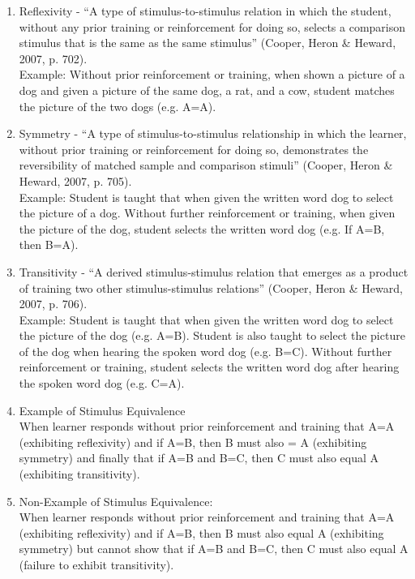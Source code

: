 \begin{enumerate}
\item Reflexivity - ``A type of stimulus-to-stimulus relation in which the student, without any prior training or reinforcement for doing so, selects a comparison stimulus that is the same as the same stimulus'' (Cooper, Heron \& Heward, 2007, p. 702).\\
 Example: Without prior reinforcement or training, when shown a picture of a dog and given a picture of the same dog, a rat, and a cow, student matches the picture of the two dogs (e.g. A=A).
\item Symmetry - ``A type of stimulus-to-stimulus relationship in which the learner, without prior training or reinforcement for doing so, demonstrates the reversibility of matched sample and comparison stimuli'' (Cooper, Heron \& Heward, 2007, p. 705).\\
 Example: Student is taught that when given the written word dog to select the picture of a dog. Without further reinforcement or training, when given the picture of the dog, student selects the written word dog (e.g. If A=B, then B=A). 
\item Transitivity - ``A derived stimulus-stimulus relation that emerges as a product of training two other stimulus-stimulus relations'' (Cooper, Heron \& Heward, 2007, p. 706).\\
 Example: Student is taught that when given the written word dog to select the picture of the dog (e.g. A=B). Student is also taught to select the picture of the dog when hearing the spoken word dog (e.g. B=C). Without further reinforcement or training, student selects the written word dog after hearing the spoken word dog (e.g. C=A). 

\item Example of Stimulus Equivalence\\
When learner responds without prior reinforcement and training that A=A (exhibiting reflexivity) and if A=B, then B must also = A (exhibiting symmetry) and finally that if A=B and B=C, then C must also equal A (exhibiting transitivity). 

\item Non-Example of Stimulus Equivalence:\\
 When learner responds without prior reinforcement and training that A=A (exhibiting reflexivity) and if A=B, then B must also equal A (exhibiting symmetry) but cannot show that if A=B and B=C, then C must also equal A (failure to exhibit transitivity). 
%
\end{enumerate}
%
